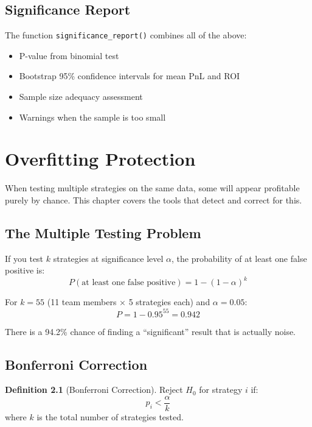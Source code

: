 \documentclass[12pt,a4paper]{report}
\theoremstyle{definition}
\newtheorem{definition}{Definition}[chapter]
\newcommand{\func}[1]{\texttt{#1()}}
\begin{document}
\section{Significance Report}

The function \func{significance\_report} combines all of the above:
\begin{itemize}
    \item P-value from binomial test
    \item Bootstrap 95\% confidence intervals for mean PnL and ROI
    \item Sample size adequacy assessment
    \item Warnings when the sample is too small
\end{itemize}


\chapter{Overfitting Protection}
\label{ch:overfitting}

When testing multiple strategies on the same data, some will appear profitable purely by chance. This chapter covers the tools that detect and correct for this.

\section{The Multiple Testing Problem}

If you test $k$ strategies at significance level $\alpha$, the probability of at least one false positive is:
\begin{equation}
    P(\text{at least one false positive}) = 1 - (1 - \alpha)^k
\end{equation}

For $k = 55$ (11 team members $\times$ 5 strategies each) and $\alpha = 0.05$:
\[
    P = 1 - 0.95^{55} = 0.942
\]

There is a 94.2\% chance of finding a ``significant'' result that is actually noise.

\section{Bonferroni Correction}
\label{sec:bonferroni}

\begin{definition}[Bonferroni Correction]
Reject $H_0$ for strategy $i$ if:
\begin{equation}
    p_i < \frac{\alpha}{k}
    \label{eq:bonferroni}
\end{equation}
where $k$ is the total number of strategies tested.
\end{definition}
\end{document}
